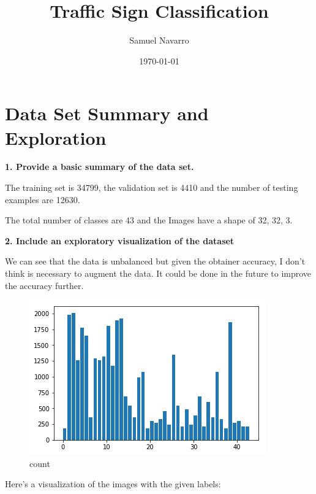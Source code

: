 \documentclass[11pt, a4paper]{article}
\begin{document}
\title{Traffic Sign Classification}
\author{Samuel Navarro}
\date{\today}
\maketitle

\section{Data Set Summary and Exploration}%
\label{sec:data_set_summary_and_exploration}

\textbf{1. Provide a basic summary of the data set.}

The training set is 34799, the validation set is 4410 and the number of testing examples are 12630.

The total number of classes are 43 and the Images have a shape of 32, 32, 3. 

\textbf{2. Include an exploratory visualization of the dataset}

We can see that the data is unbalanced but given the obtainer accuracy, I don't think is necessary to augment the data. It could be done in the future to improve the accuracy further.

\begin{figure}[htb!]
	\centering
	\includegraphics[width=0.8\linewidth]{count}
	\caption{count}
	\label{fig:count}
\end{figure}


Here's a visualization of the images with the given labels:
\end{document}
